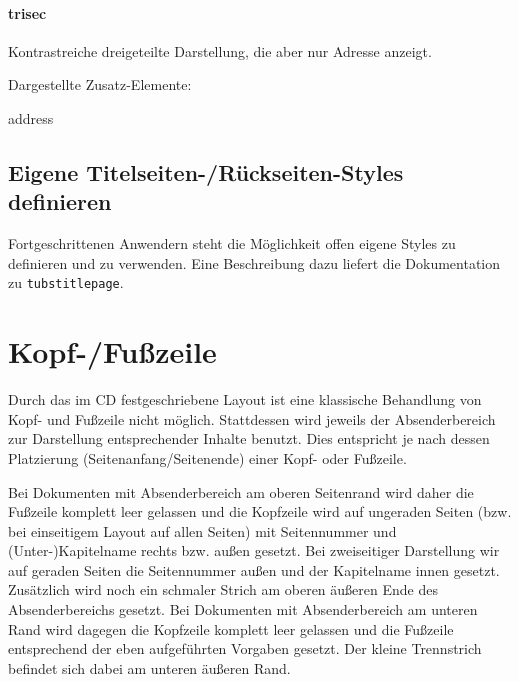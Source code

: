   \begin{minipage}[t]{0.33\textwidth}
    \null\centering\sffamily
  \end{minipage}
  \hfill
  \begin{minipage}[t]{0.6\textwidth}
    \paragraph{trisec}
    \par
    Kontrastreiche dreigeteilte Darstellung, die aber nur Adresse anzeigt.
    \par\bigskip
    \par\bigskip
    Dargestellte Zusatz-Elemente:
    \begin{compactitem}\ttfamily
      \item address
    \end{compactitem}
  \end{minipage}

\subsection{Eigene Titelseiten-/Rückseiten-Styles definieren}

Fortgeschrittenen Anwendern steht die Möglichkeit offen eigene Styles
zu definieren und zu verwenden. Eine Beschreibung dazu liefert
die Dokumentation zu \texttt{tubstitlepage}.

\section{Kopf-/Fußzeile}\label{sec:headline}

Durch das im \acs{CD} festgeschriebene Layout ist eine klassische Behandlung von
Kopf- und Fußzeile nicht möglich.
Stattdessen wird jeweils der Absenderbereich zur Darstellung entsprechender
Inhalte benutzt. Dies entspricht je nach dessen Platzierung
(Seitenanfang/Seitenende) einer Kopf- oder Fußzeile.

Bei Dokumenten mit Absenderbereich am oberen Seitenrand wird daher die Fußzeile
komplett leer gelassen und die Kopfzeile wird auf ungeraden Seiten
(bzw. bei einseitigem Layout auf allen Seiten)
mit Seitennummer und (Unter-)Kapitelname rechts bzw. außen gesetzt.
Bei zweiseitiger Darstellung wir auf geraden Seiten die Seitennummer außen und
der Kapitelname innen gesetzt.
Zusätzlich wird noch ein schmaler Strich am oberen äußeren Ende des
Absenderbereichs gesetzt.
Bei Dokumenten mit Absenderbereich am unteren Rand wird dagegen die Kopfzeile
komplett leer gelassen und die Fußzeile entsprechend der eben aufgeführten
Vorgaben gesetzt. Der kleine Trennstrich befindet sich dabei am unteren
äußeren Rand.

